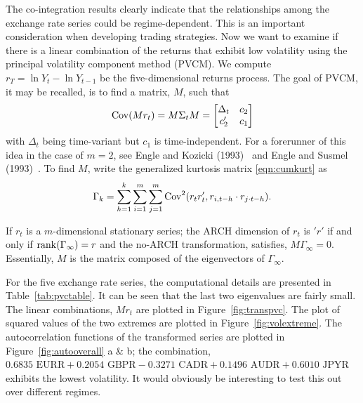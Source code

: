 	
The co-integration results clearly indicate that the relationships among the exchange rate series could be regime-dependent. This is an important consideration when developing trading strategies. Now we want to examine if there is a linear combination of the returns that exhibit low volatility using the principal volatility component method (PVCM). We compute $r_T=\ln Y_t - \ln Y_{t-1}$ be the five-dimensional returns process. The goal of PVCM, it may be recalled, is to find a matrix, $M$, such that
	\begin{equation} \label{eqn:covmatrixM}
	\cov(Mr_t)= M \Sigma_t M= 
	\begin{bmatrix}
	\Delta_t & c_2 \\
	c_2' & c_1
	\end{bmatrix}
	\end{equation}	
with $\Delta_t$ being time-variant but $c_1$ is time-independent. For a forerunner of this idea in the case of $m= 2$, see Engle and Kozicki (1993)~\cite{engle1993testing} and Engle and Susmel (1993)~\cite{engle1993common}. To find $M$, write the generalized kurtosis matrix \eqref{eqn:cumkurt} as
	\begin{equation} \label{eqn:gammakurt}
	\Gamma_k= \sum_{h=1}^k \sum_{i=1}^m \sum_{j=1}^m \cov^2(r_tr_t', r_{i,t-h} \cdot r_{j \cdot t-h}).
	\end{equation}	


\begin{result}
 If $r_t$ is a $m$-dimensional stationary series; the ARCH dimension of $r_t$ is $'r'$ if and only if $\operatorname{rank}(\Gamma_\infty)= r$ and the no-ARCH transformation, satisfies, $M \Gamma_\infty= 0$. Essentially, $M$ is the matrix composed of the eigenvectors of $\Gamma_\infty$.
\end{result}


For the five exchange rate series, the computational details are presented in Table~\ref{tab:pvctable}. It can be seen that the last two eigenvalues are fairly small. The linear combinations, $Mr_t$ are plotted in Figure~\ref{fig:transpvc}. The plot of squared values of the two extremes are plotted in Figure~\ref{fig:volextreme}. The autocorrelation functions of the transformed series are plotted in Figure~\ref{fig:autooverall} a \& b; the combination, $0.6835 \text{ EURR} + 0.2054 \text{ GBPR} - 0.3271 \text{ CADR} + 0.1496 \text{ AUDR} + 0.6010 \text{ JPYR}$ exhibits the lowest volatility. It would obviously be interesting to test this out over different regimes.

